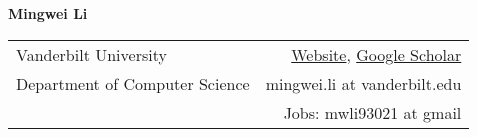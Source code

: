 \documentclass[letterpaper,11pt,oneside]{article}
\begin{document}

\noindent  \LARGE{\textbf{Mingwei Li}}  \\
\vspace{-3ex}
\normalsize


\begin{center}
\begin{tabular}{l r}
Vanderbilt University & \hspace{3in} \href{https://tiga1231.github.io/}{Website}, \href{https://scholar.google.com/citations?user=CHuXIuIAAAAJ}{Google Scholar}\\
Department of Computer Science 
    & mingwei.li at vanderbilt.edu \\
    & Jobs: mwli93021 at gmail
\end{tabular}
\end{center}

\vspace{1em}

\end{document}
